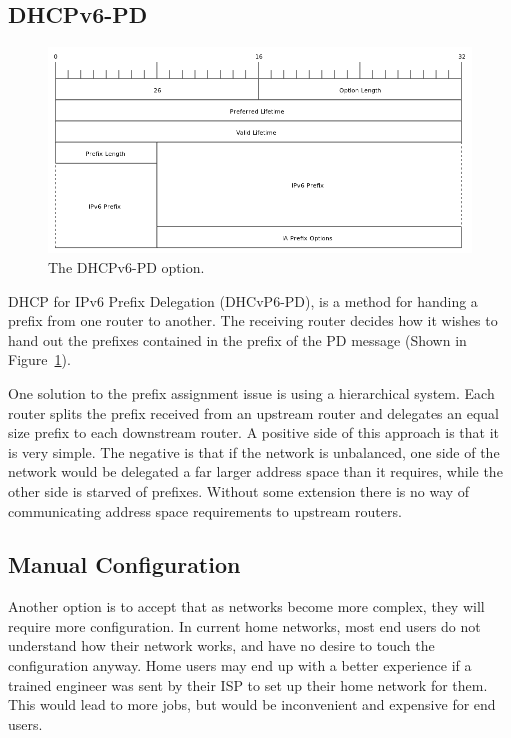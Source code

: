 \documentclass[12pt,a4paper,twoside]{report}
\begin{document}
\subsection{DHCPv6-PD}
\begin{figure}
\begin{center}
	\includegraphics[width=\linewidth]{../Diagrams/Packets/pd-option.png}
	\caption{The DHCPv6-PD option.}\label{fig:pd-option}
\end{center}
\end{figure}
DHCP for IPv6 Prefix Delegation (DHCvP6-PD), is a method for handing a prefix from one router to
another. The receiving router decides how it wishes to hand out the prefixes
contained in the prefix of the PD message (Shown in Figure~\ref{fig:pd-option}). 

One solution to the prefix assignment issue is using a hierarchical system.
Each router splits the prefix received from an upstream router and delegates an
equal size prefix to each downstream router. A positive side of this approach
is that it is very simple. The negative is that if the network is unbalanced,
one side of the network would be delegated a far larger address space than it
requires, while the other side is starved of prefixes.  Without some extension
there is no way of communicating address space requirements to upstream
routers.   

\subsection{Manual Configuration}
Another option is to accept that as networks become more complex, they will
require more configuration. In current home networks, most end users do not
understand how their network works, and have no desire to touch the
configuration anyway. Home users may end up with a better experience if a
trained engineer was sent by their ISP to set up their home network for them.
This would lead to more jobs, but would be inconvenient and expensive for end
users.
\end{document}
